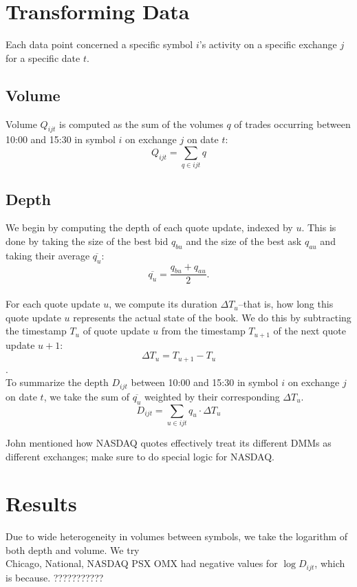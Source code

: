 \documentclass{article}
\begin{document}
\section{Transforming Data}
Each data point concerned a specific symbol $i$'s activity on a specific exchange $j$ for a specific date $t$.

\subsection{Volume}
Volume $Q_{ijt}$ is computed as the sum of the volumes $q$ of trades occurring between 10:00 and 15:30 in symbol $i$ on exchange $j$ on date $t$:\\
$$Q_{ijt} = \sum_{q \in ijt} q$$

\subsection{Depth}
We begin by computing the depth of each quote update, indexed by $u$. This is done by taking the size of the best bid $q_{bu}$ and the size of the best ask $q_{au}$ and taking their average $\overline{q_u}$:\\
$$\overline{q_u} = \frac{q_{bu} + q_{au}}{2}.$$\\
For each quote update $u$, we compute its duration $\Delta T_u$--that is, how long this quote update $u$ represents the actual state of the book. We do this by subtracting the timestamp $T_u$ of quote update $u$ from the timestamp $T_{u+1}$ of the next quote update $u+1$:\\
$$\Delta T_u = T_{u+1} - T_u$$.\\
To summarize the depth $D_{ijt}$ between 10:00 and 15:30 in symbol $i$ on exchange $j$ on date $t$, we take the sum of $\overline{q_u}$ weighted by their corresponding $\Delta T_u$.\\
$$D_{ijt} = \sum_{u \in ijt} q_u \cdot\Delta T_u$$

John mentioned how NASDAQ quotes effectively treat its different DMMs as different exchanges; make sure to do special logic for NASDAQ.

\section{Results}
Due to wide heterogeneity in volumes between symbols, we take the logarithm of both depth and volume. We try\\
Chicago, National, NASDAQ PSX OMX had negative values for $\log{D_{ijt}}$, which is because. ???????????\\
\end{document}
